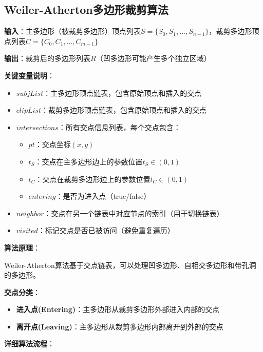 \documentclass[12pt,a4paper]{article}
\begin{document}
\begin{tcolorbox}
\subsection{Weiler-Atherton多边形裁剪算法}

\textbf{输入}：主多边形（被裁剪多边形）顶点列表$S=\{S_0, S_1, ..., S_{n-1}\}$，裁剪多边形顶点列表$C=\{C_0, C_1, ..., C_{m-1}\}$

\textbf{输出}：裁剪后的多边形列表$R$（凹多边形可能产生多个独立区域）

\textbf{关键变量说明}：
\begin{itemize}
    \item $subjList$：主多边形顶点链表，包含原始顶点和插入的交点
    \item $clipList$：裁剪多边形顶点链表，包含原始顶点和插入的交点
    \item $intersections$：所有交点信息列表，每个交点包含：
    \begin{itemize}
        \item $pt$：交点坐标$(x, y)$
        \item $t_S$：交点在主多边形边上的参数位置$t_S \in (0,1)$
        \item $t_C$：交点在裁剪多边形边上的参数位置$t_C \in (0,1)$
        \item $entering$：是否为进入点（true/false）
    \end{itemize}
    \item $neighbor$：交点在另一个链表中对应节点的索引（用于切换链表）
    \item $visited$：标记交点是否已被访问（避免重复遍历）
\end{itemize}

\textbf{算法原理}：

Weiler-Atherton算法基于交点链表，可以处理凹多边形、自相交多边形和带孔洞的多边形。

\textbf{交点分类}：
\begin{itemize}
    \item \textbf{进入点(Entering)}：主多边形从裁剪多边形外部进入内部的交点
    \item \textbf{离开点(Leaving)}：主多边形从裁剪多边形内部离开到外部的交点
\end{itemize}

\textbf{详细算法流程}：


\end{tcolorbox}
\end{document}
